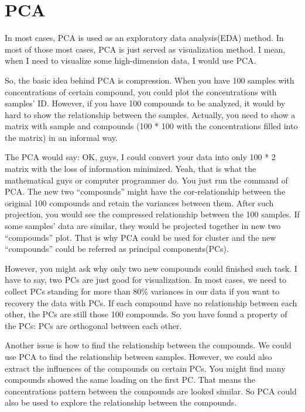 \documentclass[
]{book}
\begin{document}
\hypertarget{pca}{%
\section{PCA}\label{pca}}

In most cases, PCA is used as an exploratory data analysis(EDA) method. In most of those most cases, PCA is just served as visualization method. I mean, when I need to visualize some high-dimension data, I would use PCA.

So, the basic idea behind PCA is compression. When you have 100 samples with concentrations of certain compound, you could plot the concentrations with samples' ID. However, if you have 100 compounds to be analyzed, it would by hard to show the relationship between the samples. Actually, you need to show a matrix with sample and compounds (100 * 100 with the concentrations filled into the matrix) in an informal way.

The PCA would say: OK, guys, I could convert your data into only 100 * 2 matrix with the loss of information minimized. Yeah, that is what the mathematical guys or computer programmer do. You just run the command of PCA. The new two ``compounds'' might have the cor-relationship between the original 100 compounds and retain the variances between them. After such projection, you would see the compressed relationship between the 100 samples. If some samples' data are similar, they would be projected together in new two ``compounds'' plot. That is why PCA could be used for cluster and the new ``compounds'' could be referred as principal components(PCs).

However, you might ask why only two new compounds could finished such task. I have to say, two PCs are just good for visualization. In most cases, we need to collect PCs standing for more than 80\% variances in our data if you want to recovery the data with PCs. If each compound have no relationship between each other, the PCs are still those 100 compounds. So you have found a property of the PCs: PCs are orthogonal between each other.

Another issue is how to find the relationship between the compounds. We could use PCA to find the relationship between samples. However, we could also extract the influences of the compounds on certain PCs. You might find many compounds showed the same loading on the first PC. That means the concentrations pattern between the compounds are looked similar. So PCA could also be used to explore the relationship between the compounds.
\end{document}
